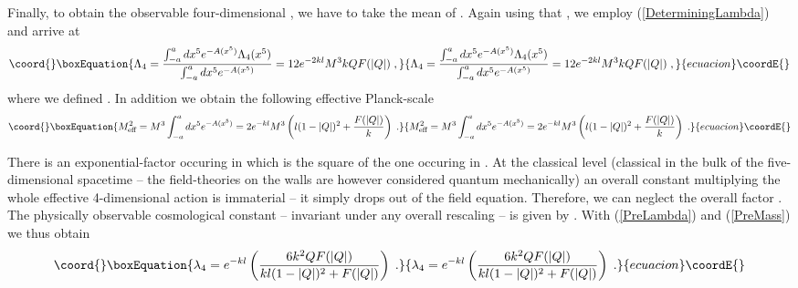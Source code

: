 \documentclass[a4paper,12pt]{article}
\begin{document}
Finally, to obtain the observable four-dimensional \coordHE{}, we
have to take the mean of \coordHE{}. Again using that \coordHE{}, we employ (\ref{DeterminingLambda}) and arrive at
\begin{equation}\coord{}\boxEquation{
  \Lambda_4 = \frac{\int_{-a}^a dx^5 e^{-A(x^5)}\Lambda_4(x^5)}
                    {\int_{-a}^a dx^5 e^{-A(x^5)}}
            = 12e^{-2kl}M^3 k Q F(|Q|) \; ,
  \label{PreLambda}
}{
  \Lambda_4 = \frac{\int_{-a}^a dx^5 e^{-A(x^5)}\Lambda_4(x^5)}
                    {\int_{-a}^a dx^5 e^{-A(x^5)}}
            = 12e^{-2kl}M^3 k Q F(|Q|) \; ,
  }{ecuacion}\coordE{}\end{equation}
where we defined \coordHE{}. In addition we obtain
the following effective Planck-scale
\begin{equation}\coord{}\boxEquation{
  M_{\text{eff}}^2 = M^3 \int_{-a}^a dx^5 e^{-A(x^5)}
                   = 2e^{-kl}M^3\left(l(1-|Q|)^2+\frac{F(|Q|)}{k}\right) 
                      \; .
  \label{PreMass}
}{
  M_{\text{eff}}^2 = M^3 \int_{-a}^a dx^5 e^{-A(x^5)}
                   = 2e^{-kl}M^3\left(l(1-|Q|)^2+\frac{F(|Q|)}{k}\right) 
                      \; .
  }{ecuacion}\coordE{}\end{equation}

There is an exponential-factor occuring in \coordHE{} which is the
square of the one occuring in \coordHE{}. At the classical
level (classical in the bulk of the five-dimensional spacetime -- the
field-theories on the walls are however considered quantum
mechanically) an overall constant \coordHE{} multiplying the whole
effective 4-dimensional action \coordHE{} is
immaterial -- it simply drops out of the field equation. Therefore, we
can neglect the overall factor \coordHE{}. The physically observable
cosmological constant -- invariant under any overall rescaling -- is
given by \coordHE{}. With (\ref{PreLambda}) and 
(\ref{PreMass}) we thus obtain
\begin{equation}\coord{}\boxEquation{
  \lambda_4 = e^{-kl}
              \left( \frac{6k^2 Q F(|Q|)}{kl(1-|Q|)^2 + F(|Q|)}
              \right) \; .
}{
  \lambda_4 = e^{-kl}
              \left( \frac{6k^2 Q F(|Q|)}{kl(1-|Q|)^2 + F(|Q|)}
              \right) \; .
}{ecuacion}\coordE{}\end{equation}
\end{document}
